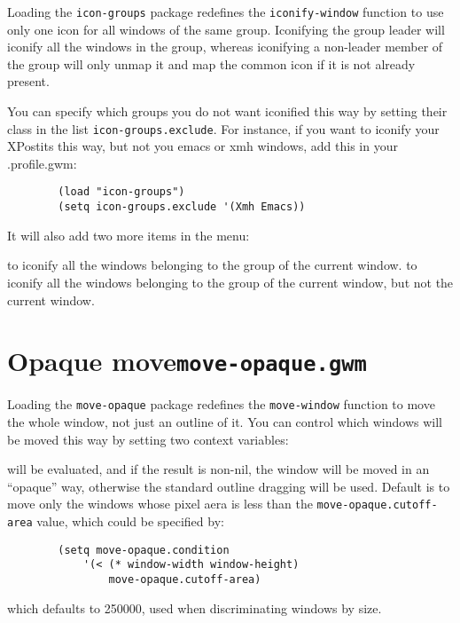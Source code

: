 Loading the {\tt icon-groups} package redefines the {\tt iconify-window}
function to use only one icon for all windows of the same group. Iconifying
the group leader will iconify all the windows in the group, whereas
iconifying a non-leader member of the group will only unmap it and map the
common icon if it is not already present.

You can specify which groups you do not want iconified this way by setting
their class in the list \verb|icon-groups.exclude|. For instance, if you want
to iconify your XPostits this way, but not you emacs or xmh windows, add this
in your .profile.gwm:

{\exemplefont\begin{verbatim}
        (load "icon-groups")
        (setq icon-groups.exclude '(Xmh Emacs))
\end{verbatim}}

It will also add two more items in the menu:
\begin{description}
 to iconify all the windows belonging to the group of the
current window.
 to iconify all the windows belonging to the group of 
the current window, but not the current window.
\end{description}

\section{Opaque move\hfill{\tt move-opaque.gwm}}
\label{move-opaque}

Loading the {\tt move-opaque} package redefines the {\tt move-window} function
to move the whole window, not just an outline of it. You can control which
windows will be moved this way by setting two context variables:

\begin{description}
 will be evaluated, and if the result is
non-nil, the window will be moved in an ``opaque'' way, otherwise the standard
outline dragging will be used. Default is to move only the windows whose pixel
aera is less than the \verb"move-opaque.cutoff-area" value, which could be
specified by:
{\exemplefont\begin{verbatim}
        (setq move-opaque.condition
            '(< (* window-width window-height) 
                move-opaque.cutoff-area)
\end{verbatim}}
 which defaults to 250000, used when
discriminating windows by size.
\end{description}	

